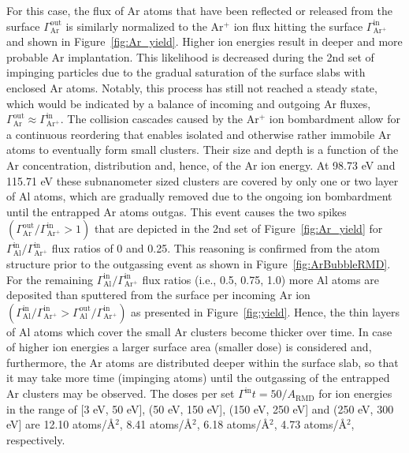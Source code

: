 \documentclass[12pt,a4paper,preprint,superscriptaddress]{revtex4-1}
\begin{document}
For this case, the flux of Ar atoms that have been reflected or released from the surface $\Gamma_\mathrm{Ar}^\mathrm{out}$ is similarly normalized to the Ar$^+$ ion flux hitting the surface $\Gamma_\mathrm{Ar^+}^\mathrm{in}$ and shown in Figure~\ref{fig:Ar_yield}. Higher ion energies result in deeper and more probable Ar implantation. This likelihood is decreased during the 2nd set of impinging particles due to the gradual saturation of the surface slabs with enclosed Ar atoms. Notably, this process has still not reached a steady state, which would be indicated by a balance of incoming and outgoing Ar fluxes, $\Gamma_\mathrm{Ar}^\mathrm{out}\approx\Gamma_\mathrm{Ar^+}^\mathrm{in}$. The collision cascades caused by the Ar$^+$ ion bombardment allow for a continuous reordering that enables isolated and otherwise rather immobile Ar atoms to eventually form small clusters. Their size and depth is a function of the Ar concentration, distribution and, hence, of the Ar ion energy. At 98.73 eV and 115.71 eV these subnanometer sized clusters are covered by only one or two layer of Al atoms, which are gradually removed due to the ongoing ion bombardment until the entrapped Ar atoms outgas. This event causes the two spikes $\left(\Gamma_\mathrm{Ar}^\mathrm{out}/\Gamma_\mathrm{Ar^+}^\mathrm{in}>1\right)$ that are depicted in the 2nd set of Figure~\ref{fig:Ar_yield} for $\Gamma_\mathrm{Al}^\mathrm{in}/\Gamma_\mathrm{Ar^+}^\mathrm{in}$ flux ratios of 0 and 0.25. This reasoning is confirmed from the atom structure prior to the outgassing event as shown in Figure~\ref{fig:ArBubbleRMD}. For the remaining $\Gamma_\mathrm{Al}^\mathrm{in}/\Gamma_\mathrm{Ar^+}^\mathrm{in}$ flux ratios (i.e., 0.5, 0.75, 1.0) more Al atoms are deposited than sputtered from the surface per incoming Ar ion $\left(\Gamma_\mathrm{Al}^\mathrm{in}/\Gamma_\mathrm{Ar^+}^\mathrm{in}>\Gamma_\mathrm{Al}^\mathrm{out}/\Gamma_\mathrm{Ar^+}^\mathrm{in}\right)$ as presented in Figure~\ref{fig:yield}. Hence, the thin layers of Al atoms which cover the small Ar clusters become thicker over time. In case of higher ion energies a larger surface area (smaller dose) is considered and, furthermore, the Ar atoms are distributed deeper within the surface slab, so that it may take more time (impinging atoms) until the outgassing of the entrapped Ar clusters may be observed. The doses per set $\Gamma^\mathrm{in}t=50/A_\mathrm{RMD}$ for ion energies in the range of [3 eV, 50 eV], (50 eV, 150 eV], (150 eV, 250 eV] and (250 eV, 300 eV] are 12.10 atoms/\r A$^2$, 8.41 atoms/\r A$^2$, 6.18 atoms/\r A$^2$, 4.73 atoms/\r A$^2$, respectively.
\end{document}
